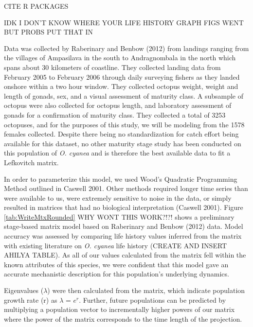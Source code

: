 \documentclass[
]{article}
\begin{document}
CITE R PACKAGES

IDK I DON'T KNOW WHERE YOUR LIFE HISTORY GRAPH FIGS WENT BUT PROBS PUT THAT IN

Data was collected by Raberinary and Benbow (2012) from landings ranging from the villages of Ampasilava in the south to Andragnombala in the north which spans about 30 kilometers of coastline. They collected landing data from February 2005 to February 2006 through daily surveying fishers as they landed onshore within a two hour window. They collected octopus weight, weight and length of gonads, sex, and a visual assessment of maturity class. A subsample of octopus were also collected for octopus length, and laboratory assessment of gonads for a confirmation of maturity class. They collected a total of 3253 octopuses, and for the purposes of this study, we will be modeling from the 1578 females collected. Despite there being no standardization for catch effort being available for this dataset, no other maturity stage study has been conducted on this population of \emph{O. cyanea} and is therefore the best available data to fit a Lefkovitch matrix.

In order to parameterize this model, we used Wood's Quadratic Programming Method outlined in Caswell 2001. Other methods required longer time series than were available to us, were extremely sensitive to noise in the data, or simply resulted in matrices that had no biological interpretation (Caswell 2001). Figure \ref{tab:WriteMtxRounded} WHY WONT THIS WORK?!?! shows a preliminary stage-based matrix model based on Raberinary and Benbow (2012) data. Model accuracy was assessed by comparing life history values inferred from the matrix with existing literature on \emph{O. cyanea} life history (CREATE AND INSERT AHILYA TABLE). As all of our values calculated from the matrix fell within the known attributes of this species, we were confident that this model gave an accurate mechanistic description for this population's underlying dynamics.

Eigenvalues (\(\lambda\)) were then calculated from the matrix, which indicate population growth rate (r) as \(\lambda\) = \(e^r\). Further, future populations can be predicted by multiplying a population vector to incrementally higher powers of our matrix where the power of the matrix corresponds to the time length of the projection.
\end{document}

